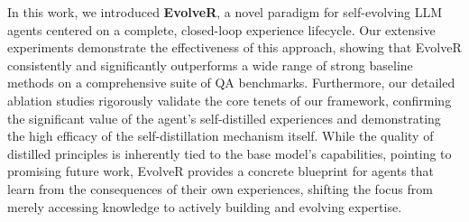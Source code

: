 \vspace{-0.5em}
In this work, we introduced \textbf{EvolveR}, a novel paradigm for self-evolving LLM agents centered on a complete, closed-loop experience lifecycle. Our extensive experiments demonstrate the effectiveness of this approach, showing that EvolveR consistently and significantly outperforms a wide range of strong baseline methods on a comprehensive suite of QA benchmarks. Furthermore, our detailed ablation studies rigorously validate the core tenets of our framework, confirming the significant value of the agent's self-distilled experiences and demonstrating the high efficacy of the self-distillation mechanism itself. While the quality of distilled principles is inherently tied to the base model's capabilities, pointing to promising future work, EvolveR provides a concrete blueprint for agents that learn from the consequences of their own experiences, shifting the focus from merely accessing knowledge to actively building and evolving expertise.